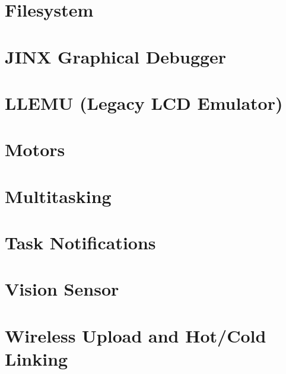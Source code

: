 \let\mypdfximage\pdfximage\def\pdfximage{\immediate\mypdfximage}\documentclass[twoside]{book}
\newcommand{\+}{\discretionary{\mbox{\scriptsize$\hookleftarrow$}}{}{}}
\begin{document}
\chapter{Filesystem}
\label{md_docs_tutorials_topical_filesystem}

\chapter{J\+I\+NX Graphical Debugger}
\label{md_docs_tutorials_topical_jinx}

\chapter{L\+L\+E\+MU (Legacy L\+CD Emulator)}
\label{md_docs_tutorials_topical_llemu}

\chapter{Motors}
\label{md_docs_tutorials_topical_motors}

\chapter{Multitasking}
\label{md_docs_tutorials_topical_multitasking}

\chapter{Task Notifications}
\label{md_docs_tutorials_topical_notifications}

\chapter{Vision Sensor}
\label{md_docs_tutorials_topical_vision}

\chapter{Wireless Upload and Hot/\+Cold Linking}
\label{md_docs_tutorials_topical_wireless-upload}

\end{document}
